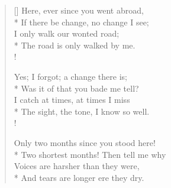 \documentclass[MAIN]{subfiles}
\begin{document}
\settowidth{\versewidth}{\vin If there be change, no change I see;}
\begin{verse}[\versewidth]
Here, ever since you went abroad,\\*
\vin If there be change, no change I see;\\
I only walk our wonted road;\\*
\vin The road is only walked by me.\\!

Yes; I forgot; a change there is;\\*
\vin Was it of that you bade me tell?\\
I catch at times, at times I miss\\*
\vin The sight, the tone, I know so well.\\!

Only two months since you stood here!\\*
\vin Two shortest months! Then tell me why\\
Voices are harsher than they were,\\*
\vin And tears are longer ere they dry.
\end{verse}
\end{document}
